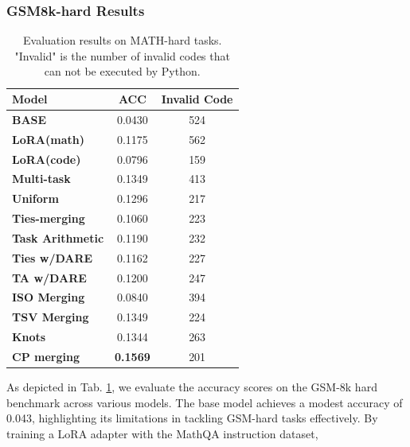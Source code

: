 \documentclass[10pt]{article} %
\begin{document}
    \subsubsection{GSM8k-hard Results}
    \begin{table}[h]
        \centering
        \begin{tabular}{l|cc}
            \toprule Model               & ACC             & Invalid Code\\
            \midrule \textbf{BASE}       & 0.0430          & 524          \\
            \textbf{LoRA(math)}          & 0.1175          & 562          \\
            \textbf{LoRA(code)}          & 0.0796          & 159          \\
            \textbf{Multi-task}          & 0.1349          & 413          \\
            \textbf{Uniform}             & 0.1296          & 217          \\
            \textbf{Ties-merging}        & 0.1060          & 223          \\
            \textbf{Task Arithmetic}     & 0.1190          & 232          \\
            \textbf{Ties w/DARE}         & 0.1162          & 227          \\
            \textbf{TA w/DARE}           & 0.1200          & 247          \\
            \textbf{ISO Merging} & 0.0840 & 394 \\
            \textbf{TSV Merging}         & 0.1349          & 224          \\
            
            \textbf{Knots} & 0.1344 & 263\\
            \midrule \textbf{CP merging} & \textbf{0.1569} & 201          \\
            \midrule
            \bottomrule
        \end{tabular}
        \caption{Evaluation results on MATH-hard tasks. "Invalid" is the number of
        invalid codes that can not be executed by Python.}
        \label{tab:math-hard}
    \end{table}
    As depicted in Tab. \ref{tab:math-hard}, we evaluate the accuracy scores on
    the GSM-8k hard benchmark across various models. The base model achieves a modest
    accuracy of 0.043, highlighting its limitations in tackling GSM-hard tasks
    effectively. By training a LoRA adapter with the MathQA instruction dataset,
\end{document}
